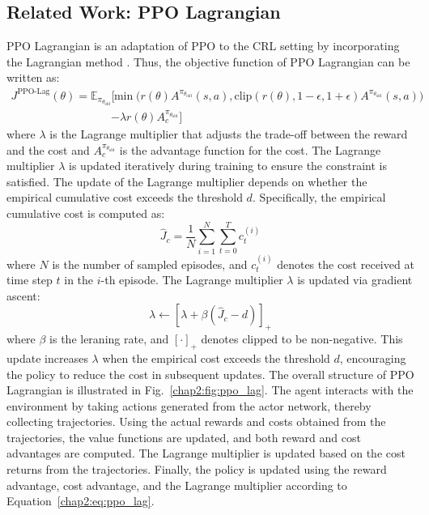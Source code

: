 \subsection{Related Work: PPO Lagrangian}

PPO Lagrangian is an adaptation of PPO to the CRL setting by incorporating the Lagrangian method \cite{PPO-Lagrangian}.
Thus, the objective function of PPO Lagrangian can be written as:
\begin{equation} \label{chap2:eq:ppo_lag}
  \begin{aligned}
    J^{\text{PPO-Lag}}(\theta) = \mathbb{E}_{\pi_{\theta_\text{old}}} \Big[ &\min \big( r(\theta) A^{\pi_{\theta_\text{old}}}(s, a), \text{clip}(r(\theta), 1 - \epsilon, 1 + \epsilon) A^{\pi_{\theta_\text{old}}}(s, a) \big) \\
    &- \lambda r(\theta) A^{\pi_{\theta_\text{old}}}_c \Big]
  \end{aligned}
\end{equation}
where $\lambda$ is the Lagrange multiplier that adjusts the trade-off between the reward and the cost and  $A^{\pi_{\theta_\text{old}}}_c$ is the advantage function for the cost.
The Lagrange multiplier $\lambda$ is updated iteratively during training to ensure the constraint is satisfied.
The update of the Lagrange multiplier depends on whether the empirical cumulative cost exceeds the threshold $d$.
Specifically, the empirical cumulative cost is computed as:
\begin{equation}
  \hat{J}_c = \frac{1}{N} \sum^N_{i = 1} \sum^T_{t = 0}  c^{(i)}_t
\end{equation}
where $N$ is the number of sampled episodes, and $c^{(i)}_t$ denotes the cost received at time step $t$ in the $i$-th episode.
The Lagrange multiplier $\lambda$ is updated via gradient ascent:
\begin{equation}
  \lambda \leftarrow \left[ \lambda + \beta\left( \hat{J}_c - d \right) \right]_+
\end{equation}
where $\beta$ is the leraning rate, and $[\cdot]_+$ denotes clipped to be non-negative.
This update increases $\lambda$ when the empirical cost exceeds the threshold $d$, encouraging the policy to reduce the cost in subsequent updates.
The overall structure of PPO Lagrangian is illustrated in Fig.~\ref{chap2:fig:ppo_lag}.
The agent interacts with the environment by taking actions generated from the actor network, thereby collecting trajectories. 
Using the actual rewards and costs obtained from the trajectories, the value functions are updated, and both reward and cost advantages are computed. 
The Lagrange multiplier is updated based on the cost returns from the trajectories. 
Finally, the policy is updated using the reward advantage, cost advantage, and the Lagrange multiplier according to Equation~\ref{chap2:eq:ppo_lag}.

